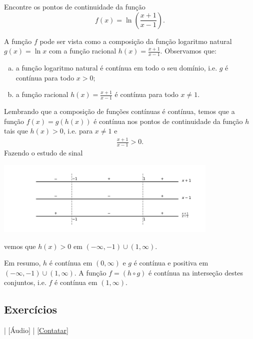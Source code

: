 \begin{exeresol}
  Encontre os pontos de continuidade da função
  \begin{equation}
    f(x) = \ln\left(\frac{x+1}{x-1}\right).
  \end{equation}
\end{exeresol}
\begin{resol}
  A função $f$ pode ser vista como a composição da função logaritmo natural $g(x) = \ln x$ com a função racional $\displaystyle h(x) = \frac{x+1}{x-1}$. Observamos que:
  \begin{enumerate}[a)]
  \item a função logaritmo natural é contínua em todo o seu domínio, i.e. $g$ é contínua para todo $x > 0$;
  \item a função racional $\displaystyle h(x) = \frac{x+1}{x-1}$ é contínua para todo $x\neq 1$.
  \end{enumerate}
  Lembrando que a composição de funções contínuas é contínua, temos que a função $f(x) = g(h(x))$ é contínua nos pontos de continuidade da função $h$ tais que $h(x) > 0$, i.e. para $x\neq 1$ e
  \begin{align}
    \frac{x+1}{x-1} > 0.
  \end{align}
  Fazendo o estudo de sinal
  \begin{center}
    \includegraphics[width=0.8\textwidth]{./cap_lim/dados/fig_cap_lim_exeresol_estsinal/fig_cap_lim_exeresol_estsinal}
  \end{center}
  vemos que $h(x) > 0$ em $(-\infty, -1)\cup (1, \infty)$.

  Em resumo, $h$ é contínua em $(0, \infty)$ e $g$ é contínua e positiva em $(-\infty, -1)\cup (1, \infty)$. A função $f = (h\circ g)$ é contínua na interseção destes conjuntos, i.e. $f$ é contínua em $(1, \infty)$. 
\end{resol}

\subsection*{Exercícios}

\begin{flushright}
  [Vídeo] | [Áudio] | \href{https://phkonzen.github.io/notas/contato.html}{[Contatar]}
\end{flushright}

